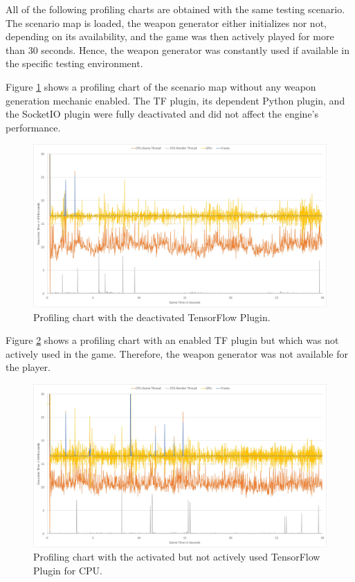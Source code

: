 \documentclass[MGS,Master,english]{twbook}%
\begin{document}
All of the following profiling charts are obtained with the same testing scenario. The scenario map is loaded, the weapon generator either initializes nor not, depending on its availability, and the game was then actively played for more than 30 seconds. Hence, the weapon generator was constantly used if available in the specific testing environment. 

Figure \ref{scenario::profiling_noTF} shows a profiling chart of the scenario map without any weapon generation mechanic enabled. The TF plugin, its dependent Python plugin, and the SocketIO plugin were fully deactivated and did not affect the engine’s performance.
\begin{figure}[!ht]
	\centering
	\includegraphics[width=1.0\linewidth]{PICs/Profiling/deactivated_plugin}
	\caption{Profiling chart with the deactivated TensorFlow Plugin.} \label{scenario::profiling_noTF}
\end{figure}

Figure \ref{scenario::profiling_TF} shows a profiling chart with an enabled TF plugin but which was not actively used in the game. Therefore, the weapon generator was not available for the player.
\begin{figure}[!ht]
	\centering
	\includegraphics[width=1.0\linewidth]{PICs/Profiling/activated_plugin_no_tf_used}
	\caption{Profiling chart with the activated but not actively used TensorFlow Plugin for CPU.} \label{scenario::profiling_TF}
\end{figure}
\end{document}
